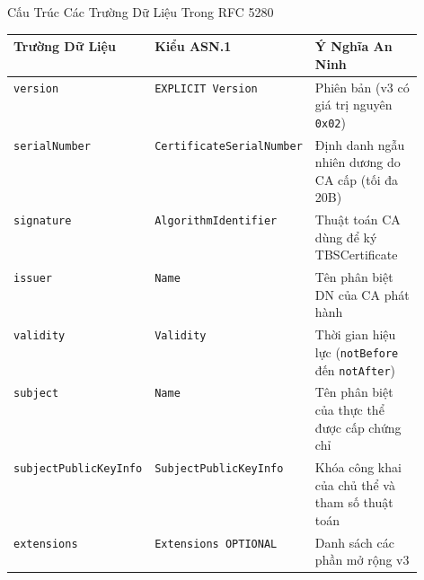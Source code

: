 \begin{frame}{Cấu Trúc Các Trường Dữ Liệu Trong RFC 5280}
  \begin{table}[h]
    \centering\scriptsize
    \begin{tabularx}{\linewidth}{@{}p{0.25\linewidth} p{0.28\linewidth} X@{}}
      \toprule
      \textbf{Trường Dữ Liệu} & \textbf{Kiểu ASN.1} & \textbf{Ý Nghĩa An Ninh} \\
      \midrule
      \texttt{version} & \texttt{EXPLICIT Version} & Phiên bản (v3 có giá trị nguyên \texttt{0x02}) \\
      \texttt{serialNumber} & \texttt{CertificateSerialNumber} & Định danh ngẫu nhiên dương do CA cấp (tối đa 20B) \\
      \texttt{signature} & \texttt{AlgorithmIdentifier} & Thuật toán CA dùng để ký TBSCertificate \\
      \texttt{issuer} & \texttt{Name} & Tên phân biệt DN của CA phát hành \\
      \texttt{validity} & \texttt{Validity} & Thời gian hiệu lực (\texttt{notBefore} đến \texttt{notAfter}) \\
      \texttt{subject} & \texttt{Name} & Tên phân biệt của thực thể được cấp chứng chỉ \\
      \texttt{subjectPublicKeyInfo} & \texttt{SubjectPublicKeyInfo} & Khóa công khai của chủ thể và tham số thuật toán \\
      \texttt{extensions} & \texttt{Extensions OPTIONAL} & Danh sách các phần mở rộng v3 \\
      \bottomrule
    \end{tabularx}
  \end{table}
\end{frame}

